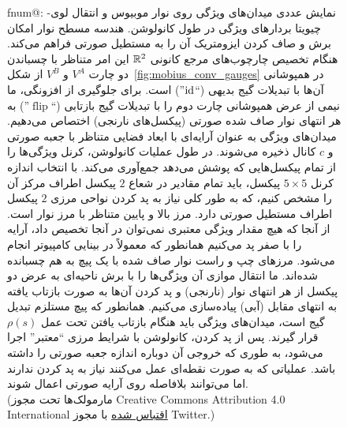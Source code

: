 \begin{figure}
	\csname fnum@\@captype\endcsname: %
	\makeatother
	نمایش عددی میدان‌های ویژگی روی نوار موبیوس و انتقال لوی-چیویتا بردارهای ویژگی در طول کانولوشن.
	هندسه مسطح نوار امکان برش و صاف کردن ایزومتریک آن را به مستطیل صورتی فراهم می‌کند.
	هنگام تخصیص چارچوب‌های مرجع کانونی $\mathbb{R}^2$ این امر متناظر با چسباندن دو چارت $V^A$ و $V^B$ از شکل~\ref{fig:mobius_conv_gauges} در همپوشانی آن‌ها با تبدیلات گیج بدیهی (``$\mathrm{id}$'') است.
	برای جلوگیری از افزونگی، ما نیمی از عرض همپوشانی چارت دوم را با تبدیلات گیج بازتابی (``$\operatorname{flip}$'') به هر انتهای نوار صاف شده صورتی (پیکسل‌های نارنجی) اختصاص می‌دهیم.
	میدان‌های ویژگی به عنوان آرایه‌ای با ابعاد فضایی متناظر با جعبه صورتی و $c$ کانال ذخیره می‌شوند.
	در طول عملیات کانولوشن، کرنل ویژگی‌ها را از تمام پیکسل‌هایی که پوشش می‌دهد جمع‌آوری می‌کند.
	با انتخاب اندازه کرنل $5\times5$ پیکسل، باید تمام مقادیر در شعاع $2$ پیکسل اطراف مرکز آن را مشخص کنیم، که به طور کلی نیاز به پد کردن نواحی مرزی $2$ پیکسل اطراف مستطیل صورتی دارد.
	مرز بالا و پایین متناظر با مرز نوار است.
	از آنجا که هیچ مقدار ویژگی معتبری نمی‌توان در آنجا تخصیص داد، آرایه را با صفر پد می‌کنیم همانطور که معمولاً در بینایی کامپیوتر انجام می‌شود.
	مرزهای چپ و راست نوار صاف شده با یک پیچ به هم چسبانده شده‌اند.
	ما انتقال موازی آن ویژگی‌ها را با برش ناحیه‌ای به عرض دو پیکسل از هر انتهای نوار (نارنجی) و پد کردن آن‌ها به صورت بازتاب یافته به انتهای مقابل (آبی) پیاده‌سازی می‌کنیم.
	همانطور که پیچ مستلزم تبدیل گیج است، میدان‌های ویژگی باید هنگام بازتاب یافتن تحت عمل $\rho(s)$ قرار گیرند.
	پس از پد کردن، کانولوشن با شرایط مرزی ``معتبر'' اجرا می‌شود، به طوری که خروجی آن دوباره اندازه جعبه صورتی را داشته باشد.
	عملیاتی که به صورت نقطه‌ای عمل می‌کنند نیاز به پد کردن ندارند اما می‌توانند بلافاصله روی آرایه صورتی اعمال شوند.
	{
		\\ \color{gray} \scriptsize
		(مارمولک‌ها تحت مجوز Creative Commons Attribution 4.0 International
		\href{https://github.com/twitter/twemoji/blob/gh-pages/LICENSE-GRAPHICS}{\underline{اقتباس شده}}
		با مجوز Twitter.)
	}
	\label{fig:mobius_conv_numerical}
\end{figure}

